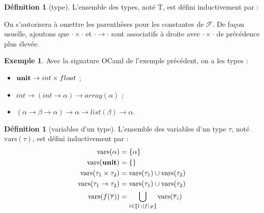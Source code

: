 \documentclass[a4paper]{report}
\theoremstyle{definition}
\newtheorem{definition}[theoreme]{Définition}
\newtheorem{exemple}[theoreme]{Exemple}
\newcommand{\interval}[2]{[\![#1\,;#2]\!]}
\newcommand{\unit}{\bold{unit}}
\newcommand{\V}{\mathscr{V}}
\newcommand{\F}{\mathscr{F}}
\newcommand{\T}{\mathrm{T}}
\begin{document}
\begin{definition}[type]
  L'ensemble des types, noté $\T$, est défini inductivement par :
\end{definition}

On s'autorisera à omettre les parenthèses pour les constantes de $\F$. De façon usuelle, ajoutons que $\cdot \times \cdot$ et $\cdot \rightarrow \cdot$ sont associatifs à droite avec $\cdot \times \cdot$ de précédence plus élevée.

\begin{exemple}
  Avec la signature OCaml de l'exemple précédent, on a les types :
  \begin{itemize}
    \item $\unit \rightarrow int \times float$ ;
    \item $int \rightarrow (int \rightarrow \alpha) \rightarrow array (\alpha)$ ;
    \item $(\alpha \rightarrow \beta \rightarrow \alpha) \rightarrow \alpha \rightarrow list (\beta) \rightarrow \alpha$.
  \end{itemize}
\end{exemple}

\begin{definition}[variables d'un type]
  L'ensemble des variables d'un type $\tau$, noté $\mathrm{vars} (\tau)$, est défini inductivement par :
  \begin{align*}
      \mathrm{vars} (\alpha) &=
      \{ \alpha \}
    \\
      \mathrm{vars} (\unit) &=
      \{ \}
    \\
      \mathrm{vars} (\tau_1 \times \tau_2) &=
      \mathrm{vars} (\tau_1) \cup \mathrm{vars} (\tau_2)
    \\
      \mathrm{vars} (\tau_1 \rightarrow \tau_2) &=
      \mathrm{vars} (\tau_1) \cup \mathrm{vars} (\tau_2)
    \\
      \mathrm{vars} (f (\overline\tau)) &=
      \bigcup_{i \in \interval 1 {|f|_\F}} \mathrm{vars} (\overline\tau_i)
  \end{align*}
\end{definition}
\end{document}
